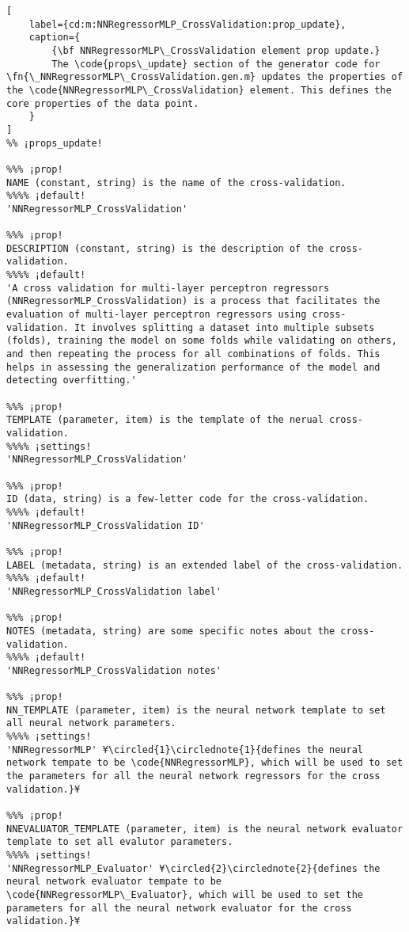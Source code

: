 \documentclass{tufte-handout}
\begin{document}
\begin{lstlisting}[
	label={cd:m:NNRegressorMLP_CrossValidation:prop_update},
	caption={
		{\bf NNRegressorMLP\_CrossValidation element prop update.}
		The \code{props\_update} section of the generator code for \fn{\_NNRegressorMLP\_CrossValidation.gen.m} updates the properties of the \code{NNRegressorMLP\_CrossValidation} element. This defines the core properties of the data point.
	}
]
%% ¡props_update!

%%% ¡prop!
NAME (constant, string) is the name of the cross-validation.
%%%% ¡default!
'NNRegressorMLP_CrossValidation'

%%% ¡prop!
DESCRIPTION (constant, string) is the description of the cross-validation.
%%%% ¡default!
'A cross validation for multi-layer perceptron regressors (NNRegressorMLP_CrossValidation) is a process that facilitates the evaluation of multi-layer perceptron regressors using cross-validation. It involves splitting a dataset into multiple subsets (folds), training the model on some folds while validating on others, and then repeating the process for all combinations of folds. This helps in assessing the generalization performance of the model and detecting overfitting.'

%%% ¡prop!
TEMPLATE (parameter, item) is the template of the nerual cross-validation.
%%%% ¡settings!
'NNRegressorMLP_CrossValidation'

%%% ¡prop!
ID (data, string) is a few-letter code for the cross-validation.
%%%% ¡default!
'NNRegressorMLP_CrossValidation ID'

%%% ¡prop!
LABEL (metadata, string) is an extended label of the cross-validation.
%%%% ¡default!
'NNRegressorMLP_CrossValidation label'

%%% ¡prop!
NOTES (metadata, string) are some specific notes about the cross-validation.
%%%% ¡default!
'NNRegressorMLP_CrossValidation notes'

%%% ¡prop!
NN_TEMPLATE (parameter, item) is the neural network template to set all neural network parameters.
%%%% ¡settings!
'NNRegressorMLP' ¥\circled{1}\circlednote{1}{defines the neural network tempate to be \code{NNRegressorMLP}, which will be used to set the parameters for all the neural network regressors for the cross validation.}¥

%%% ¡prop!
NNEVALUATOR_TEMPLATE (parameter, item) is the neural network evaluator template to set all evalutor parameters.
%%%% ¡settings!
'NNRegressorMLP_Evaluator' ¥\circled{2}\circlednote{2}{defines the neural network evaluator tempate to be \code{NNRegressorMLP\_Evaluator}, which will be used to set the parameters for all the neural network evaluator for the cross validation.}¥


\end{lstlisting}
\end{document}
